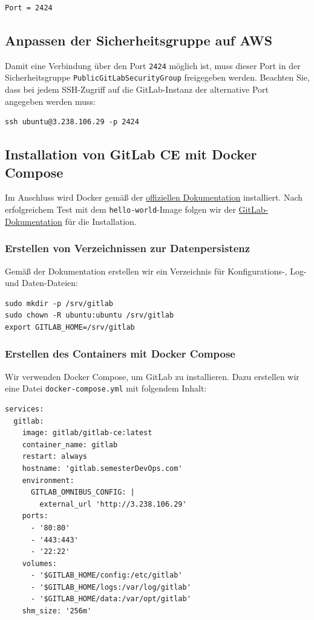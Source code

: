 \documentclass[a4paper,12pt]{article}
\begin{document}
\begin{verbatim}
Port = 2424
\end{verbatim}

\subsection{Anpassen der Sicherheitsgruppe auf AWS}
Damit eine Verbindung über den Port \texttt{2424} möglich ist, muss dieser Port in der Sicherheitsgruppe \texttt{PublicGitLabSecurityGroup} freigegeben werden. Beachten Sie, dass bei jedem SSH-Zugriff auf die GitLab-Instanz der alternative Port angegeben werden muss:

\begin{verbatim}
ssh ubuntu@3.238.106.29 -p 2424
\end{verbatim}

\subsection{Installation von GitLab CE mit Docker Compose}

Im Anschluss wird Docker gemäß der \href{https://docs.docker.com/engine/install/ubuntu/}{offiziellen Dokumentation} installiert. Nach erfolgreichem Test mit dem \texttt{hello-world}-Image folgen wir der \href{https://docs.gitlab.com/ee/install/docker/installation.html}{GitLab-Dokumentation} für die Installation.

\subsubsection{Erstellen von Verzeichnissen zur Datenpersistenz}
Gemäß der Dokumentation erstellen wir ein Verzeichnis für Konfigurations-, Log- und Daten-Dateien:

\begin{verbatim}
sudo mkdir -p /srv/gitlab
sudo chown -R ubuntu:ubuntu /srv/gitlab
export GITLAB_HOME=/srv/gitlab
\end{verbatim}

\newpage

\subsubsection{Erstellen des Containers mit Docker Compose}
Wir verwenden Docker Compose, um GitLab zu installieren. Dazu erstellen wir eine Datei \texttt{docker-compose.yml} mit folgendem Inhalt:

\begin{verbatim}
services:
  gitlab:
    image: gitlab/gitlab-ce:latest
    container_name: gitlab
    restart: always
    hostname: 'gitlab.semesterDevOps.com'
    environment:
      GITLAB_OMNIBUS_CONFIG: |
        external_url 'http://3.238.106.29'
    ports:
      - '80:80'
      - '443:443'
      - '22:22'
    volumes:
      - '$GITLAB_HOME/config:/etc/gitlab'
      - '$GITLAB_HOME/logs:/var/log/gitlab'
      - '$GITLAB_HOME/data:/var/opt/gitlab'
    shm_size: '256m'
\end{verbatim}
\end{document}
